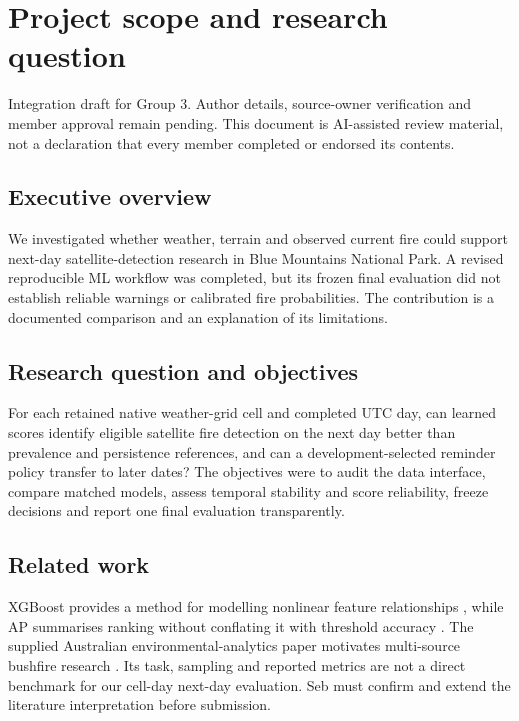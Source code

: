 \section*{Project scope and research question}
Integration draft for Group 3. Author details, source-owner verification and member approval remain pending. This document is AI-assisted review material, not a declaration that every member completed or endorsed its contents.

\subsection*{Executive overview}

We investigated whether weather, terrain and observed current fire could support next-day satellite-detection research in Blue Mountains National Park. A revised reproducible ML workflow was completed, but its frozen final evaluation did not establish reliable warnings or calibrated fire probabilities. The contribution is a documented comparison and an explanation of its limitations.

\subsection*{Research question and objectives}

For each retained native weather-grid cell and completed UTC day, can learned scores identify eligible satellite fire detection on the next day better than prevalence and persistence references, and can a development-selected reminder policy transfer to later dates? The objectives were to audit the data interface, compare matched models, assess temporal stability and score reliability, freeze decisions and report one final evaluation transparently.

\subsection*{Related work}

XGBoost provides a method for modelling nonlinear feature relationships \cite{mlChen2016}, while AP summarises ranking without conflating it with threshold accuracy \cite{mlAveragePrecision}. The supplied Australian environmental-analytics paper motivates multi-source bushfire research \cite{mlJois2026}. Its task, sampling and reported metrics are not a direct benchmark for our cell-day next-day evaluation. Seb must confirm and extend the literature interpretation before submission.


